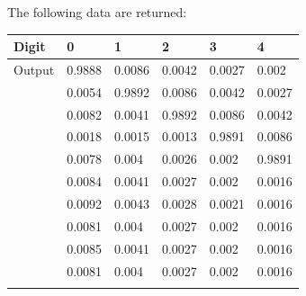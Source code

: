 \documentclass[letterpaper,11pt]{article}
\begin{document}
The following data are returned:\\

\begin{table}[H]
\centering
\begin{tabular}{l|lllll}
Digit  & 0                             & 1                             & 2                             & 3                             & 4                             \\ \hline
Output & {\color[HTML]{3531FF} 0.9888} & 0.0086                        & 0.0042                        & 0.0027                        & 0.002                         \\
       & 0.0054                        & {\color[HTML]{3531FF} 0.9892} & 0.0086                        & 0.0042                        & 0.0027                        \\
       & 0.0082                        & 0.0041                        & {\color[HTML]{3531FF} 0.9892} & 0.0086                        & 0.0042                        \\
       & 0.0018                        & 0.0015                        & 0.0013                        & {\color[HTML]{3531FF} 0.9891} & 0.0086                        \\
       & 0.0078                        & 0.004                         & 0.0026                        & 0.002                         & {\color[HTML]{3531FF} 0.9891} \\
       & 0.0084                        & 0.0041                        & 0.0027                        & 0.002                         & 0.0016                        \\
       & 0.0092                        & 0.0043                        & 0.0028                        & 0.0021                        & 0.0016                        \\
       & 0.0081                        & 0.004                         & 0.0027                        & 0.002                         & 0.0016                        \\
       & 0.0085                        & 0.0041                        & 0.0027                        & 0.002                         & 0.0016                        \\
       & 0.0081                        & 0.004                         & 0.0027                        & 0.002                         & 0.0016                        \\
       &                               &                               &                               &                               &                               \\

\end{tabular}
\end{table}
\end{document}
